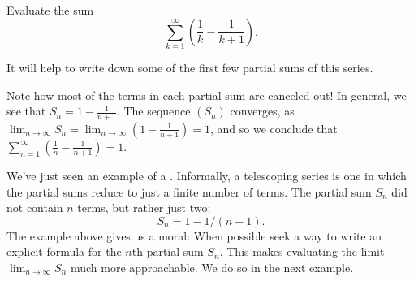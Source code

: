 \documentclass{ximera}
\begin{document}
\begin{example}
  Evaluate the sum
  \[
  \sum_{k=1}^\infty\left(\frac{1}{k}-\frac{1}{k+1}\right).
  \]
  \begin{explanation}
It will help to write down some of the first few partial sums of this
series.
\begin{image}
\end{image}
Note how most of the terms in each partial sum are canceled out! In
general, we see that $S_n = 1-\frac{1}{n+1}$. The sequence $(S_n)$
converges, as $\lim_{n\to\infty}S_n =
\lim_{n\to\infty}\left(1-\frac1{n+1}\right) = 1$, and so we conclude
that $\sum_{n=1}^\infty \left(\frac1n-\frac1{n+1}\right) = 1$.
  \end{explanation}
\end{example}
We've just seen an example of a . Informally,
a telescoping series is one in which the partial sums reduce to just a
finite number of terms. The partial sum $S_n$ did not contain $n$
terms, but rather just two:
\[
S_n = 1 - 1/(n+1).
\]
The example above gives us a moral: When possible seek a way to write
an explicit formula for the $n$th partial sum $S_n$. This makes
evaluating the limit $\lim_{n\to\infty} S_n$ much more
approachable. We do so in the next example.
\end{document}
